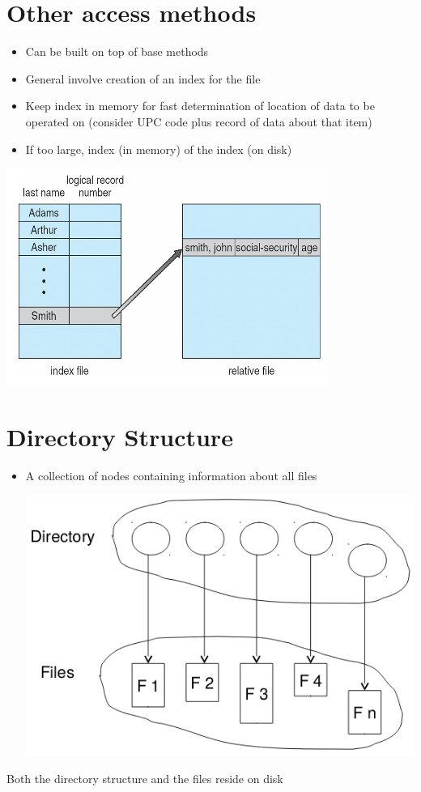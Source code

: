 \documentclass{article}[18pt]
\begin{document}
\section{Other access methods}
\begin{itemize}
	\item Can be built on top of base methods
	\item General involve creation of an index for the file
	\item Keep index in memory for fast determination of location of data to be operated on (consider UPC code plus record of data about that item)
	\item If too large, index (in memory) of the index (on disk)
\end{itemize}
\begin{center}
	\includegraphics[scale=0.7]{database}
\end{center}
\section{Directory Structure}
\begin{itemize}
	\item A collection of nodes containing information about all files
	\begin{center}
		\includegraphics[scale=0.7]{"directory structure"}
	\end{center}
\end{itemize}
Both the directory structure and the files reside on disk
\end{document}
